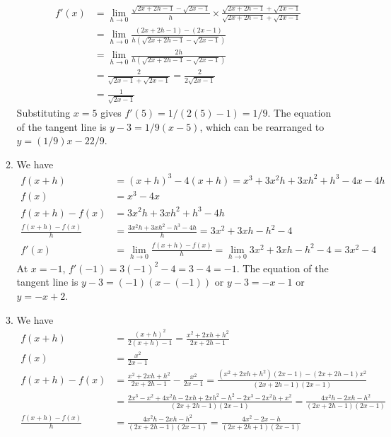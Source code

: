 \documentclass{article}
\begin{document}
\begin{enumerate}
\begin{enumerate}
\begin{align*}
      f'(x) &= \lim_{h\to 0} \frac{\sqrt{2x+2h-1} - \sqrt{2x-1}}{h}
              \times \frac{\sqrt{2x+2h-1} + \sqrt{2x-1}}{\sqrt{2x+2h-1} +
              \sqrt{2x-1}}
      \\
            &= \lim_{h\to 0} \frac{(2x+2h-1) -
              (2x-1)}{h(\sqrt{2x+2h-1}-\sqrt{2x-1})}
      \\
            &= \lim_{h\to 0} \frac{2h}{h(\sqrt{2x+2h-1}-\sqrt{2x-1})}
      \\
            &= \frac{2}{\sqrt{2x-1}+\sqrt{2x-1}} = \frac{2}{2\sqrt{2x-1}}
      \\
            &= \frac{1}{\sqrt{2x-1}}
    \end{align*}
    Substituting $x=5$ gives $f'(5) = 1/(2(5)-1) = 1/9$.  The equation
    of the tangent line is $y-3 = 1/9(x-5)$, which can be rearranged
    to $y=(1/9) x - 22/9$.
  \item %
    We have
    \begin{align*}
      f(x+h) &= (x+h)^3 - 4(x+h) = x^3 + 3x^2 h + 3xh^2 + h^3 - 4x -
      4h \\
      f(x) &= x^3 - 4x \\
      f(x+h) - f(x) &= 3x^2 h + 3xh^2 + h^3 - 4h \\
      \frac{f(x+h) - f(x)}{h} &= \frac{3x^2h + 3xh^2 - h^3 - 4h}{h} =
      3x^2 + 3xh - h^2 - 4 \\
      f'(x) &= \lim_{h\to 0} \frac{f(x+h)-f(x)}{h} = \lim_{h\to 0}
      3x^2 + 3xh - h^2 - 4 = 3x^2 - 4
    \end{align*}
    At $x=-1$, $f'(-1) = 3(-1)^2 - 4 = 3 -4 = -1$.  The equation of
    the tangent line is $y-3 = (-1)(x-(-1))$ or $y-3 = -x -1$ or
    $y=-x+2$.
  \item %
    We have
    \begin{align*}
      f(x+h) &= \frac{(x+h)^2}{2(x+h)-1} = \frac{x^2+2xh+h^2}{2x+2h-1}
      \\
      f(x) &= \frac{x^2}{2x-1} \\
      f(x+h) - f(x) &= \frac{x^2+2xh+h^2}{2x+2h-1} - \frac{x^2}{2x-1}
                      = \frac{(x^2+2xh+h^2)(2x-1)-(2x+2h-1)x^2}{(2x+2h-1)(2x-1)}
                      \\
                      &= \frac{2x^3 - x^2 + 4x^2h - 2xh + 2xh^2 - h^2 - 2x^3 - 2x^2h +
                        x^2 }{(2x+2h-1)(2x-1)} 
                        = \frac{4x^2h-2xh-h^2}{(2x+2h-1)(2x-1)} \\
      \frac{f(x+h) - f(x)}{h} &= \frac{4x^2h-2xh-h^2}{(2x+2h-1)(2x-1)}
                                = \frac{4x^2 - 2x -h}{(2x+2h+1)(2x-1)} \\

\end{align*}
\end{enumerate}
\end{enumerate}
\end{document}
